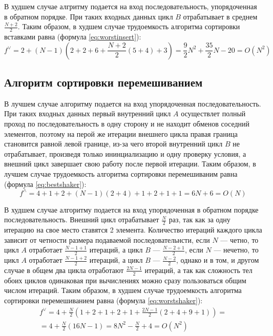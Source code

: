 В худшем случае алгритму подается на вход последовательность, упорядоченная в
обратном порядке. При таких входных данных цикл $B$ отрабатывает в среднем
$\frac{N+2}{2}$. Таким образом, в худшем случае трудоемкость алгоритма
сортировки вставками равна (формула \ref{eq:worstinsert}):
    \begin{equation}\label{eq:worstinsert}
        f^{\vee} = 2 + (N - 1)(2 + 2 + 6 + \frac{N+2}{2}(5 + 4) + 3)
                   = \frac{9}{2}N^2 + \frac{35}{2}N - 20 = O(N^2)
    \end{equation}

\subsection{Алгоритм сортировки перемешиванием}

В лучшем случае алгоритму подается на вход упорядоченная последовательность.
При таких входных данных первый внутренний цикл $A$ осуществлет полный проход
по последовательность в одну сторону и не находит обменов соседний элементов,
поэтому на перой же итерации внешнего цикла правая граница становится равной
левой границе, из-за чего второй внутренний цикл $B$ не отрабатывает, произведя
только ининциализацию и одну проверку условия, а внешний цикл завершает свою
работу после первой итерации. Таким образом, в лучшем случае трудоемкость
алгоритма сортировки перемешиваним равна (формула \ref{eq:bestshaker}):
    \begin{equation}\label{eq:bestshaker}
        f^{\wedge} = 4 + 1 + 2 + (N - 1)(2 + 4) + 1 + 2 + 1 + 1 =
                     6N + 6 = O(N)
    \end{equation}

В худшем случае алгоритму подается на вход упорядоченная в обратном порядке
последовательность. Внешний цикл отрабатывает $\frac{N}{2}$ раз, так как за
одну итерацию на свое место ставятся 2 элемента. Количество итераций каждого
цикла зависит от четности размера подаваемой последовательнсти, если $N$ ---
четно, то цикл $A$ отработает $\frac{N - 1 + 1}{2}$ итераций, а цикл $B$ ---
$\frac{N - 2 + 1}{2}$, если $N$ --- нечетно, то цикл $A$ отработает $\frac{N -
1 + 2}{2}$ итераций, а цикл $B$ --- $\frac{N - 2}{2}$, однако и в том, и другом
случае в общем два цикла отработают $\frac{2N-1}{2}$ итераций, а так как
сложность тел обоих циклов одинаковая при вычислениях можно сразу пользоваться
общим числом итераций. Таким образом, в худшем случае трудоемкость алгоритма
сортировки перемешиванием равна (формула \ref{eq:worstshaker}):
    \begin{multline}\label{eq:worstshaker}
        f^{\vee} = 4 + \frac{N}{2}(1 + 2 + 1 + 2 + 1 + \frac{2N-1}{2}(2 + 4 + 9
                   + 1)) =\\= 4 + \frac{N}{2}(16N - 1) = 8N^2-\frac{N}{2} + 4 =
                   O(N^2)
    \end{multline}

